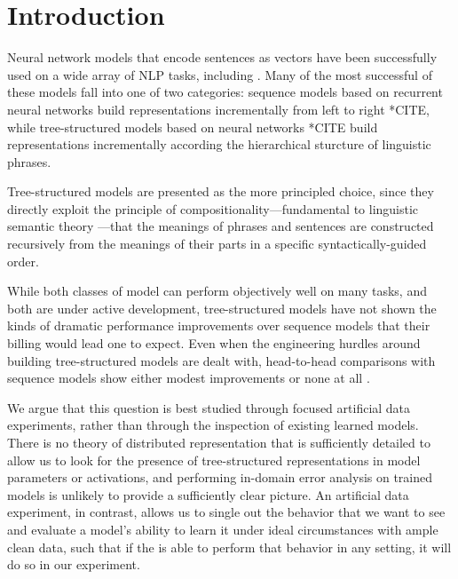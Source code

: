 \section{Introduction}\label{sec:intro}

Neural network models that encode sentences as vectors have been successfully used on a wide array of NLP tasks, including . Many of the most successful of these models fall into one of two categories: sequence models based on recurrent neural networks build representations incrementally from left to right *CITE, while tree-structured models based on  neural networks *CITE build representations incrementally according the hierarchical sturcture of linguistic phrases. 

Tree-structured models are presented as the more principled choice, since they directly exploit the principle of compositionality---fundamental to linguistic semantic theory \cite{Partee84,Janssen97}---that the meanings of phrases and sentences are constructed recursively from the meanings of their parts in a specific syntactically-guided order.

While both classes of model can perform objectively well on many tasks, and both are under active development, tree-structured models have not shown the kinds of dramatic performance improvements over sequence models that their billing would lead one to expect. Even when the engineering hurdles around building tree-structured models are dealt with, head-to-head comparisons with sequence models show either modest improvements  or none at all . 

We argue that this question is best studied through focused artificial data experiments, rather than through the inspection of existing learned models. There is no theory of distributed representation that is sufficiently detailed to allow us to look for the presence of tree-structured representations in model parameters or activations, and performing in-domain error analysis on trained models is unlikely to provide a sufficiently clear picture. An artificial data experiment, in contrast, allows us to single out the behavior that we want to see and evaluate a model's ability to learn it under ideal circumstances with ample clean data, such that if the is able to perform that behavior in any setting, it will do so in our experiment.

